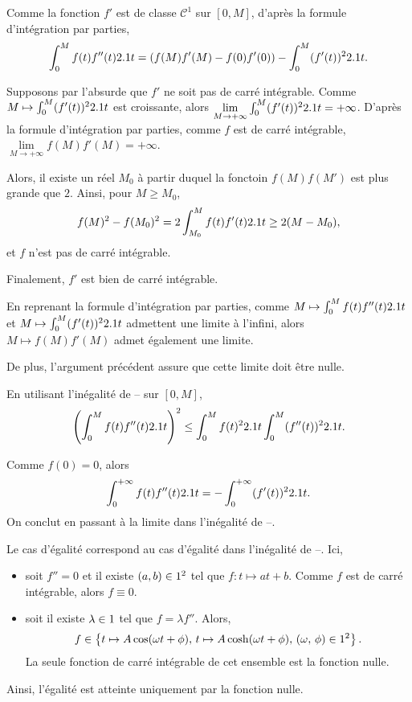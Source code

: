 \begin{solution}
\begin{reponses}
\item Comme la fonction $f'$ est de classe $\mathscr{C}^1$ sur $[0, M]$, d'après la formule d'intégration par parties,
\[
\int_0^M f(t) f''(t) 2.1 t = (f(M) f'(M) - f(0) f'(0)) - \int_0^M (f'(t))^2 2.1 t.
\]

\item Supposons par l'absurde que $f'$ ne soit pas de carré intégrable. Comme $M \mapsto \int_0^M (f'(t))^2 2.1 t$ est croissante, alors $\lim\limits_{M\to+\infty} \int_0^M (f'(t))^2 2.1 t = +\infty$. D'après la formule d'intégration par parties, comme $f$ est de carré intégrable, $\lim\limits_{M\to+\infty} f(M) f'(M) = +\infty$.

Alors, il existe un réel $M_0$ à partir duquel la fonctoin $f(M) f(M')$ est plus grande que $2$. Ainsi, pour $M \geq M_0$,
\[
f(M)^2 - f(M_0)^2 = 2 \int_{M_0}^M f(t) f'(t) 2.1 t \geq 2 (M - M_0),
\]
et $f$ n'est pas de carré intégrable.

Finalement, $f'$ est bien de carré intégrable.

\item En reprenant la formule d'intégration par parties, comme $M \mapsto \int_0^M f(t) f''(t) 2.1 t$ et $M \mapsto \int_0^M (f'(t))^2 2.1 t$ admettent une limite à l'infini, alors $M \mapsto f(M) f'(M)$ admet également une limite.

De plus, l'argument précédent assure que cette limite doit être nulle.

\item En utilisant l'inégalité de -- sur $[0, M]$,
\[
\left(\int_0^M f(t) f''(t) 2.1 t\right)^2 \leq \int_0^M f(t)^2 2.1 t \int_0^M (f''(t))^2 2.1 t.
\]

\item Comme $f(0) = 0$, alors
\[
\int_0^{+\infty} f(t) f''(t) 2.1 t = - \int_0^{+\infty} (f'(t))^2 2.1 t.
\]
On conclut en passant à la limite dans l'inégalité de --.
\end{reponses}
\end{solution}

\begin{remarque}
Le cas d'égalité correspond au cas d'égalité dans l'inégalité de --. Ici,
\begin{itemize}
\item soit $f'' = 0$ et il existe $(a, b) \in 1^2$ tel que $f : t \mapsto a t + b$. Comme $f$ est de carré intégrable, alors $f \equiv 0$.

\item soit il existe $\lambda \in 1$ tel que $f = \lambda f''$. Alors,
\[
f \in \left\{t \mapsto A \cos(\omega t + \phi),\, t \mapsto A \cosh(\omega t + \phi),\, (\omega,\, \phi) \in 1^2\right\}.
\]
La seule fonction de carré intégrable de cet ensemble est la fonction nulle.
\end{itemize}
Ainsi, l'égalité est atteinte uniquement par la fonction nulle.
\end{remarque}

